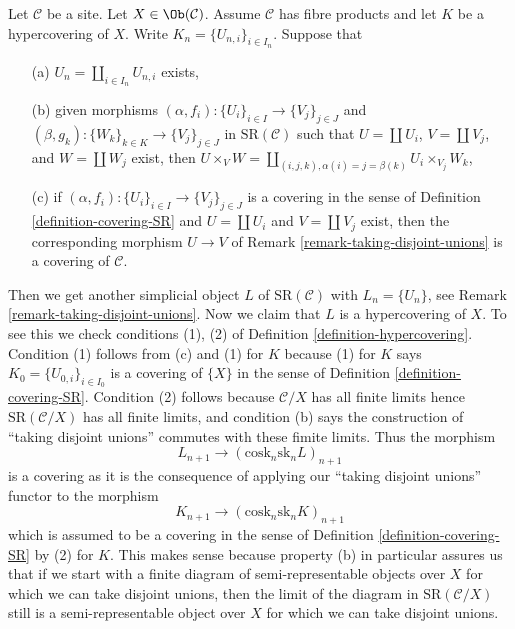 \begin{remark}
\label{remark-take-unions-hypercovering-X}
Let $\mathcal{C}$ be a site. Let $X \in \Ob(\mathcal{C})$.
Assume $\mathcal{C}$ has fibre products and let $K$ be a hypercovering of $X$.
Write $K_n = \{U_{n, i}\}_{i \in I_n}$. Suppose that
\begin{enumerate}
\item[(a)] $U_n = \coprod_{i \in I_n} U_{n, i}$ exists,
\item[(b)] given morphisms
$(\alpha, f_i) : \{U_i\}_{i \in I} \to \{V_j\}_{j \in J}$ and
$(\beta, g_k) : \{W_k\}_{k \in K} \to \{V_j\}_{j \in J}$
in $\text{SR}(\mathcal{C})$ such that
$U = \coprod U_i$, $V = \coprod V_j$, and $W = \coprod W_j$
exist, then $U \times_V W =
\coprod_{(i, j, k), \alpha(i) = j = \beta(k)} U_i \times_{V_j} W_k$,
\item[(c)] if $(\alpha, f_i) : \{U_i\}_{i \in I} \to \{V_j\}_{j \in J}$
is a covering in the sense of
Definition \ref{definition-covering-SR}
and $U = \coprod U_i$ and $V = \coprod V_j$ exist,
then the corresponding morphism $U \to V$
of Remark \ref{remark-taking-disjoint-unions}
is a covering of $\mathcal{C}$.
\end{enumerate}
Then we get another simplicial object $L$ of $\text{SR}(\mathcal{C})$
with $L_n = \{U_n\}$, see
Remark \ref{remark-taking-disjoint-unions}.
Now we claim that $L$ is a hypercovering of $X$.
To see this we check conditions (1), (2) of
Definition \ref{definition-hypercovering}.
Condition (1) follows from (c) and (1) for $K$
because (1) for $K$ says $K_0 = \{U_{0, i}\}_{i \in I_0}$
is a covering of $\{X\}$ in the sense of
Definition \ref{definition-covering-SR}.
Condition (2) follows because $\mathcal{C}/X$ has
all finite limits hence $\text{SR}(\mathcal{C}/X)$
has all finite limits, and condition (b) says the
construction of ``taking disjoint unions'' commutes
with these fimite limits. Thus the morphism
$$
L_{n + 1} \longrightarrow (\text{cosk}_n \text{sk}_n L)_{n + 1}
$$
is a covering as it is the consequence of applying our
``taking disjoint unions'' functor to the morphism
$$
K_{n + 1} \longrightarrow (\text{cosk}_n \text{sk}_n K)_{n + 1}
$$
which is assumed to be a covering in the sense of
Definition \ref{definition-covering-SR} by (2) for $K$.
This makes sense because property (b) in particular assures
us that if we start with a finite diagram of
semi-representable objects over $X$
for which we can take disjoint unions, then
the limit of the diagram in $\text{SR}(\mathcal{C}/X)$
still is a semi-representable object over $X$ for which
we can take disjoint unions.
\end{remark}











